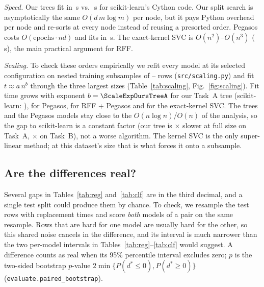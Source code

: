 \documentclass[10pt,twocolumn,a4paper]{article}
\newcommand{\gen}[1]{}
\newcommand{\fit}[1]{\resizebox{\ifdim\width>\linewidth\linewidth\else\width\fi}{!}{#1}}
\begin{document}
\emph{Speed.} Our trees fit in \OurTreeRegFit{}\,s vs.\
\SkTreeRegFit{}\,s for scikit-learn's Cython code. Our split search is
asymptotically the same $O(d\,m\log m)$ per node, but it pays Python
overhead per node and re-sorts at every node instead of reusing a
presorted order. Pegasos costs $O(\text{epochs}\cdot n d)$ and fits in
\OurSVMFit\,s. The exact-kernel SVC is $O(n^2)$--$O(n^3)$ (\SkSVCFit\,s),
the main practical argument for RFF.

\emph{Scaling.} To check these orders empirically we refit every model at
its selected configuration on nested training subsamples of
\ScaleMinN--\ScaleMaxN{} rows (\texttt{src/scaling.py}) and fit
$t\approx a\,n^{b}$ through the three largest sizes
(Table~\ref{tab:scaling}, Fig.~\ref{fig:scaling}). Fit time grows with
exponent $b=\ScaleExpOursTreeA$ for our Task~A tree
(scikit-learn: \ScaleExpSkTreeA), \ScaleExpPegasos{} for Pegasos,
\ScaleExpRFF{} for RFF + Pegasos and \ScaleExpSVC{} for the exact-kernel
SVC. The trees and the Pegasos models stay close to the
$O(n\log n)$/$O(n)$ of the analysis, so the gap to scikit-learn is a
constant factor (our tree is \ScaleTreeRatioA$\times$ slower at full size
on Task~A, \ScaleTreeRatioB$\times$ on Task~B), not a worse algorithm.
The kernel SVC is the only super-linear method; at this dataset's size
that is what forces it onto a subsample.

\begin{table}[t]
  \centering
  \caption{Fit time vs.\ training size: exponent $b$ of
  $t\approx a\,n^b$ (three largest subsamples), and fit/predict time at the
  largest size (predict on the validation split). Theory: CART
  $O(n\log n)$, Pegasos/SGD/LIBLINEAR $O(n)$ per epoch, kernel SVC
  $O(n^2)$--$O(n^3)$.}
  \label{tab:scaling}
  \fit{\gen{tab_scaling}}
\end{table}

\begin{table}[t]
  \centering
  \caption{Our tree vs.\ scikit-learn, node by node (final models; depth
  and leaves as ours / sklearn). Same: identical split. Ties: equal-gain
  alternatives. f32: explained by scikit-learn's float32 cast. Other:
  unexplained (0 for a correct implementation).}
  \label{tab:tree-compare}
  \fit{\gen{tab_tree_compare}}
\end{table}

\subsection{Are the differences real?}\label{sec:paired}
Several gaps in Tables~\ref{tab:reg} and~\ref{tab:clf} are in the third
decimal, and a single test split could produce them by chance. To check,
we resample the \NTest{} test rows with replacement \NBoot{} times and
score \emph{both} models of a pair on the same resample. Rows that are
hard for one model are usually hard for the other, so this shared noise
cancels in the difference, and its interval is much narrower than the two
per-model intervals in Tables~\ref{tab:reg}--\ref{tab:clf} would suggest.
A difference counts as real when its 95\% percentile interval excludes
zero; $p$ is the two-sided bootstrap $p$-value
$2\min\{P(d^*\le 0),P(d^*\ge 0)\}$ (\texttt{evaluate.paired\_bootstrap}).
\end{document}
